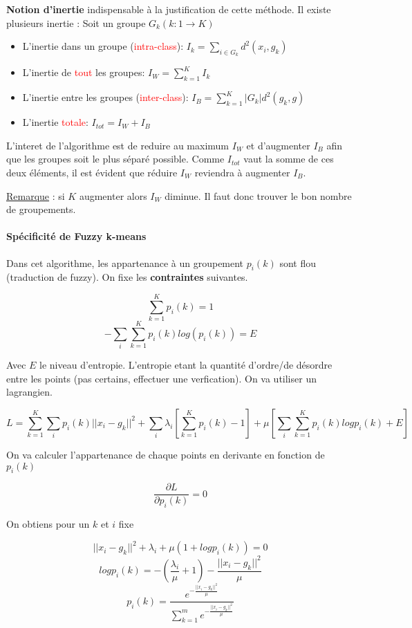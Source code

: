 \documentclass[a4paper, 11pt, onecolumn]{article}
\begin{document}
\begin{enumerate}
\begin{framed}
  \textbf{Notion d'inertie} indispensable à la justification de cette méthode. Il existe plusieurs
  inertie :
Soit un groupe $G_k (k: 1\rightarrow K)$
\begin{itemize}
  \item L'inertie dans un groupe (\textcolor{red}{intra-class}): $I_k = \sum_{i \in G_k}d^2(x_i,g_k)$
  \item L'inertie de \textcolor{red}{tout} les groupes: $I_W = \sum_{k=1}^{K} I_k$
  \item L'inertie entre les groupes (\textcolor{red}{inter-class}): $I_B = \sum_{k=1}^{K}|G_k|d^2(g_k,g)$
  \item L'inertie \textcolor{red}{totale}: $I_{tot} = I_W + I_B$
\end{itemize}
\end{framed}

L'interet de l'algorithme est de reduire au maximum $I_W$ et d'augmenter $I_B$ afin que les groupes soit le plus séparé possible. 
Comme $I_{tot}$ vaut la somme de ces deux éléments, il est évident que réduire $I_W$ reviendra à augmenter $I_B$.

\underline{Remarque} : si $K$ augmenter alors $I_W$ diminue. Il faut donc trouver le bon nombre de groupements. 

\paragraph{Spécificité de Fuzzy k-means}
Dans cet algorithme, les appartenance à un groupement $p_i(k)$ sont flou (traduction de fuzzy). On fixe les \textbf{contraintes} suivantes.

$$\sum_{k=1}^K p_i(k)=1$$
$$- \sum_i \sum_{k=1}^K p_i(k) log(p_i(k)) = E$$

Avec $E$ le niveau d'entropie. L'entropie etant la quantité d'ordre/de désordre entre les points (pas certains, effectuer une verfication). On va utiliser un lagrangien.

$$L = \sum_{k=1}^K \sum_i p_i(k) ||x_i-g_k||^2 + \sum_i \lambda_i[\sum_{k=1}^K p_i(k) - 1] + \mu [\sum_i\sum_{k=1}^K p_i(k) log p_i(k) + E]$$

On va calculer l'appartenance de chaque points en derivante en fonction de $p_i(k)$

$$\frac{\partial L}{\partial p_i(k)} = 0$$

On obtiens pour un $k$ et $i$ fixe

$$||x_i - g_k||^2 + \lambda_i + \mu (1 + log p_i(k)) = 0$$
$$log p_i(k) = - (\frac{\lambda_i}{\mu} + 1) - \frac{||x_i - g_k||^2}{\mu}$$
$$p_i(k) = \frac{e^{-\frac{||x_i-g_k||^2}{\mu}}}{\sum_{k=1}^m e^{-\frac{||x_i-g_k||^2}{\mu}}}$$


\end{enumerate}
\end{document}
